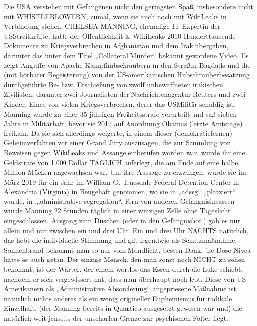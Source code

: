 \begin{multicols}{2}
{Die USA verstehen mit Gefangenen nicht den geringsten
Spaß, insbesondere nicht mit WHISTLEBLOWERN, zumal, wenn sie auch noch mit WikiLeaks in Verbindung
stehen. \textCR
CHELSEA MANNING, ehemalige IT-Expertin der USStreitkräfte, hatte der Öffentlichkeit \& WikiLeaks 2010
Hunderttausende Dokumente zu Kriegsverbrechen in
Afghanistan und dem Irak übergeben, darunter das unter dem Titel „Collateral Murder“ bekannt gewordene Video. Es zeigt Angriffe von Apache-Kampfhubschraubern
in den Straßen Bagdads und die (mit hörbarer Begeisterung) von der US-amerikanischen Hubschrauberbesatzung durchgeführte Be- bzw. Erschießung von zwölf
unbewaffneten irakischen Zivilisten, darunter zwei Journalisten der Nachrichtenagentur Reuters und zwei Kinder. Eines von vielen Kriegsverbrechen, derer das USMilitär schuldig ist.\textCR
Manning wurde zu einer 35-jährigen Freiheitsstrafe verurteilt und saß sieben Jahre in Militärhaft, bevor sie 2017
auf Anordnung Obamas (letzte Amtstage) freikam. Da
sie sich allerdings weigerte, in einem dieser (demokratiefernen) Geheimverfahren vor einer Grand Jury auszusagen, die zur Sammlung von Beweisen gegen WikiLeaks und Assange einberufen worden war, wurde ihr eine Geldstrafe von 1.000 Dollar TÄGLICH auferlegt, die am
Ende auf eine halbe Million Mücken angewachsen war.\textCR
Um ihre Aussage zu erzwingen, wurde sie im März 2019
für ein Jahr im William G. Truesdale Federal Detention
Center in Alexandria (Virginia) in Beugehaft genommen,
wo sie in „adseg“ „platziert“ wurde, in „administrative segregation“. Fern von anderen Gefängnisinsassen wurde
Manning 22 Stunden täglich in einer winzigen Zelle ohne
Tageslicht eingeschlossen. Ausgang zum Duschen (oder
in den Gefängnishof ) gab es nur allein und nur zwischen
ein und drei Uhr. Ein und drei Uhr NACHTS natürlich,
das hebt die individuelle Stimmung und gilt irgendwie
als Schutzmaßnahme, Sonnenbrand bekommt man so
nur vom Mondlicht, besten Dank, ’ne Dose Nivea hätte
es auch getan. Der einzige Mensch, den man sonst noch
NICHT zu sehen bekommt, ist der Wärter, der einem
wortlos das Essen durch die Luke schiebt, nachdem er
sich vergewissert hat, dass man überhaupt noch lebt.
Diese von US-Amerikanern als „Administrative Absonderung“ angepriesene Maßnahme ist natürlich nichts
anderes als ein wenig origineller Euphemismus für radikale Einzelhaft, (der Manning bereits in Quantico ausgesetzt gewesen war und) die natürlich weit jenseits der unscharfen Grenze zur psychischen Folter liegt.}


\end{multicols}
